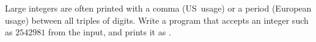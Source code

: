 \begin{exercise}
  \label{ex:mille-comma}
  Large integers are often printed with a comma (US~usage) or a period
  (European usage) between all triples of digits. Write a program that
  accepts an integer such as $2542981$ from the input, and prints it as
  .
\end{exercise}

\endinput

The website
\url{http://www.codeforwin.in/2015/06/for-do-while-loop-programming-exercises.html}

\begin{comment}
  \begin{multicols}{2}
    \begin{lstlisting}
    \end{lstlisting}
    \columnbreak
    \begin{lstlisting}
    \end{lstlisting}
  \end{multicols}
  \begin{multicols}{2}
    \begin{lstlisting}
    \end{lstlisting}
    \columnbreak
    \begin{lstlisting}
    \end{lstlisting}
  \end{multicols}
\end{comment}
